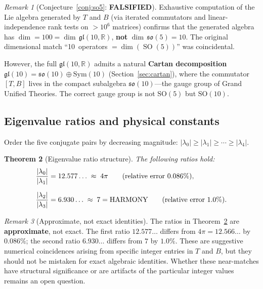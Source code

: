 \documentclass[11pt]{article}
\newtheorem{theorem}{Theorem}[section]
\theoremstyle{definition}
\theoremstyle{remark}
\newtheorem{remark}[theorem]{Remark}
\begin{document}
\begin{remark}[Conjecture~\ref{conj:so5}: \textbf{FALSIFIED}]
\label{rem:so5-revision}
Exhaustive computation of the Lie algebra generated by $T$ and $B$ (via
iterated commutators and linear-independence rank tests on $>10^6$ matrices)
confirms that the generated algebra has
$\dim = 100 = \dim\,\mathfrak{gl}(10,\mathbb{R})$,
\textbf{not} $\dim\,\mathfrak{so}(5) = 10$.  The original dimensional match
``10~operators $= \dim(\operatorname{SO}(5))$'' was coincidental.

However, the full $\mathfrak{gl}(10,\mathbb{R})$ admits a natural
\textbf{Cartan decomposition}
$\mathfrak{gl}(10) = \mathfrak{so}(10) \oplus \mathrm{Sym}(10)$
(Section~\ref{sec:cartan}), where the commutator $[T,B]$ lives in the compact
subalgebra $\mathfrak{so}(10)$---the gauge group of Grand Unified Theories.
The correct gauge group is not $\mathrm{SO}(5)$ but $\mathrm{SO}(10)$.
\end{remark}

\subsection{Eigenvalue ratios and physical constants}

Order the five conjugate pairs by decreasing magnitude:
$|\lambda_0| \ge |\lambda_1| \ge \cdots \ge |\lambda_4|$.

\begin{theorem}[Eigenvalue ratio structure]
\label{thm:ratios}
The following ratios hold:
\begin{align}
  \frac{|\lambda_0|}{|\lambda_1|} &= 12.577\ldots \;\approx\; 4\pi
    \qquad\textup{(relative error $0.086\%$)},
    \label{eq:ratio-4pi} \\[6pt]
  \frac{|\lambda_2|}{|\lambda_3|} &= 6.930\ldots \;\approx\; 7 = \textup{HARMONY}
    \qquad\textup{(relative error $1.0\%$)}.
    \label{eq:ratio-harmony}
\end{align}
\end{theorem}

\begin{remark}[Approximate, not exact identities]
\label{rem:approx-ratios}
The ratios in Theorem~\ref{thm:ratios} are \textbf{approximate}, not exact.
The first ratio $12.577\ldots$ differs from $4\pi = 12.566\ldots$ by $0.086\%$;
the second ratio $6.930\ldots$ differs from $7$ by $1.0\%$.  These are
suggestive numerical coincidences arising from specific integer entries in $T$
and $B$, but they should not be mistaken for exact algebraic identities.
Whether these near-matches have structural significance or are artifacts of the
particular integer values remains an open question.
\end{remark}
\end{document}
